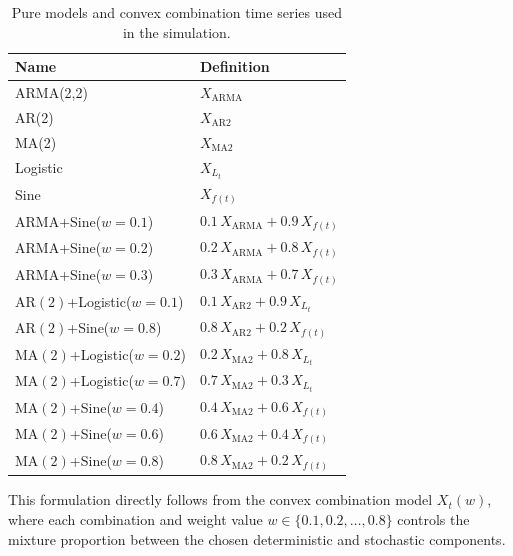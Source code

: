 \documentclass[12pt,a4paper]{article}
\begin{document}
\begin{enumerate}
		
		
	
\begin{table}[H]
	\centering
	\caption{Pure models and convex combination time series used in the simulation.}
	\label{tab:series_list}
	\begin{tabular}{ll}
		\hline
		Name & Definition \\
		\hline
		ARMA(2,2) & $X_{\text{ARMA}}$ \\
		AR(2)     & $X_{\text{AR2}}$ \\
		MA(2)     & $X_{\text{MA2}}$ \\
		Logistic  & $X_{L_t}$ \\
		Sine      & $X_{f(t)}$ \\
		\hline
		$\mathrm{ARMA}$+Sine($w=0.1$) & $0.1\,X_{\text{ARMA}} + 0.9\,X_{f(t)}$ \\
		$\mathrm{ARMA}$+Sine($w=0.2$) & $0.2\,X_{\text{ARMA}} + 0.8\,X_{f(t)}$ \\
		$\mathrm{ARMA}$+Sine($w=0.3$) & $0.3\,X_{\text{ARMA}} + 0.7\,X_{f(t)}$ \\
		\hline
		$\mathrm{AR(2)}$+Logistic($w=0.1$) & $0.1\,X_{\text{AR2}} + 0.9\,X_{L_t}$ \\
		$\mathrm{AR(2)}$+Sine($w=0.8$) & $0.8\,X_{\text{AR2}} + 0.2\,X_{f(t)}$ \\
		\hline
		$\mathrm{MA(2)}$+Logistic($w=0.2$) & $0.2\,X_{\text{MA2}} + 0.8\,X_{L_t}$ \\
		$\mathrm{MA(2)}$+Logistic($w=0.7$) & $0.7\,X_{\text{MA2}} + 0.3\,X_{L_t}$ \\
		$\mathrm{MA(2)}$+Sine($w=0.4$) & $0.4\,X_{\text{MA2}} + 0.6\,X_{f(t)}$ \\
		$\mathrm{MA(2)}$+Sine($w=0.6$) & $0.6\,X_{\text{MA2}} + 0.4\,X_{f(t)}$ \\
		$\mathrm{MA(2)}$+Sine($w=0.8$) & $0.8\,X_{\text{MA2}} + 0.2\,X_{f(t)}$ \\
		\hline
	\end{tabular}
\end{table}
	
	
This formulation directly follows from the convex combination model $X_t(w)$, where each combination and weight value $w \in \{0.1, 0.2, \ldots, 0.8\}$ controls the mixture proportion between the chosen deterministic and stochastic components.
\end{enumerate}
\end{document}
